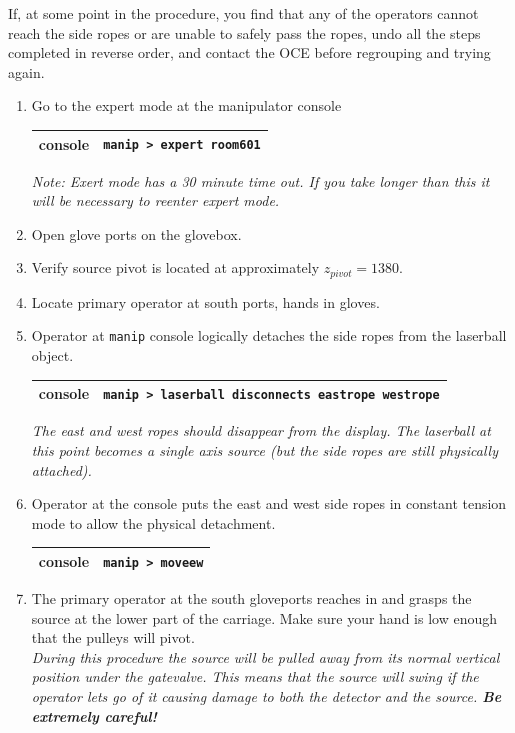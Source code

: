 \documentclass[11pt]{article}
\begin{document}
If, at some point in the procedure, you find that any of the operators cannot reach the side ropes or are unable to safely pass the ropes, undo all the steps completed in reverse order, and contact the OCE before regrouping and trying again.
\begin{enumerate}
\item \CheckBox[name=dsr1]{} Go to the expert mode at the manipulator console
\begin{center}
\begin{tabular}{|c|c|}
\hline
console & \verb+manip > expert room601+\\
\hline
\end{tabular}
\end{center}
{\it Note: Exert mode has a 30 minute time out. If you take longer than this it will be necessary to reenter expert mode.}
\item \CheckBox[name=dsr2]{} Open glove ports on the glovebox.
\item \CheckBox[name=dsr3]{} Verify source pivot is located at approximately $z_{pivot} = 1380$.
\item \CheckBox[name=dsr4]{} Locate primary operator at south ports, hands in gloves.
\item \CheckBox[name=dsr5]{} Operator at \verb+manip+ console logically detaches the side ropes from the laserball object.
\begin{center}
\begin{tabular}{|c|c|}
\hline
console & \verb+manip > laserball disconnects eastrope westrope+ \\
\hline
\end{tabular}
\end{center}
{\it The east and west ropes should disappear from the display. The laserball at this point becomes a single axis source (but the side ropes are still physically attached).}
\item \CheckBox[name=dsr6]{} Operator at the console puts the east and west side ropes in constant tension mode to allow the physical detachment.
\begin{center}
\begin{tabular}{|c|c|}
\hline
console & \verb+manip > moveew+\\
\hline
\end{tabular}
\end{center}
\item \CheckBox[name=dsr7]{} The primary operator at the south gloveports reaches in and grasps the source at the lower part of the carriage. Make sure your hand is low enough that the pulleys will pivot. \\ {\it During this procedure the source will be pulled away from its normal vertical position under the gatevalve. This means that the source will swing if the operator lets go of it causing damage to both the detector and the source. {\bf Be extremely careful!}}

\end{enumerate}
\end{document}
